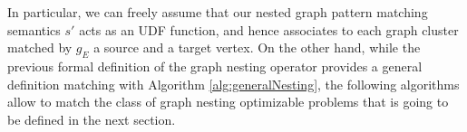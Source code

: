 
In particular, we can freely assume that our nested graph pattern matching semantics $s'$ acts as an UDF function, and hence associates to each graph cluster matched by $g_E$ a source and a target vertex. On the other hand, while the previous formal definition of the graph nesting operator provides a general definition matching with Algorithm \vref{alg:generalNesting}, the following  algorithms allow to match the class of graph nesting optimizable problems that is going to be defined in the next section.